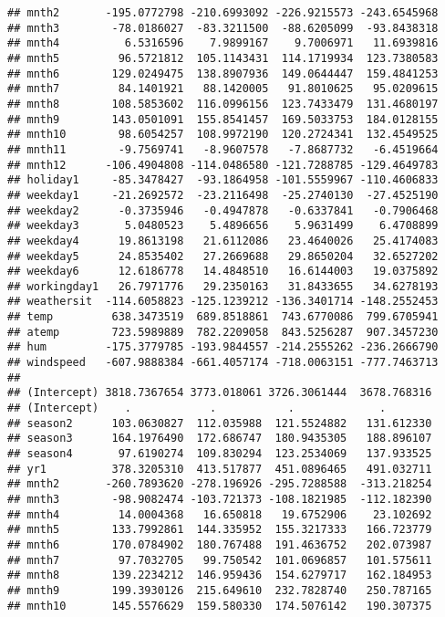 \documentclass[]{article}
\begin{document}
\begin{verbatim}
## mnth2       -195.0772798 -210.6993092 -226.9215573 -243.6545968
## mnth3        -78.0186027  -83.3211500  -88.6205099  -93.8438318
## mnth4          6.5316596    7.9899167    9.7006971   11.6939816
## mnth5         96.5721812  105.1143431  114.1719934  123.7380583
## mnth6        129.0249475  138.8907936  149.0644447  159.4841253
## mnth7         84.1401921   88.1420005   91.8010625   95.0209615
## mnth8        108.5853602  116.0996156  123.7433479  131.4680197
## mnth9        143.0501091  155.8541457  169.5033753  184.0128155
## mnth10        98.6054257  108.9972190  120.2724341  132.4549525
## mnth11        -9.7569741   -8.9607578   -7.8687732   -6.4519664
## mnth12      -106.4904808 -114.0486580 -121.7288785 -129.4649783
## holiday1     -85.3478427  -93.1864958 -101.5559967 -110.4606833
## weekday1     -21.2692572  -23.2116498  -25.2740130  -27.4525190
## weekday2      -0.3735946   -0.4947878   -0.6337841   -0.7906468
## weekday3       5.0480523    5.4896656    5.9631499    6.4708899
## weekday4      19.8613198   21.6112086   23.4640026   25.4174083
## weekday5      24.8535402   27.2669688   29.8650204   32.6527202
## weekday6      12.6186778   14.4848510   16.6144003   19.0375892
## workingday1   26.7971776   29.2350163   31.8433655   34.6278193
## weathersit  -114.6058823 -125.1239212 -136.3401714 -148.2552453
## temp         638.3473519  689.8518861  743.6770086  799.6705941
## atemp        723.5989889  782.2209058  843.5256287  907.3457230
## hum         -175.3779785 -193.9844557 -214.2555262 -236.2666790
## windspeed   -607.9888384 -661.4057174 -718.0063151 -777.7463713
##                                                               
## (Intercept) 3818.7367654 3773.018061 3726.3061444  3678.768316
## (Intercept)    .            .           .             .       
## season2      103.0630827  112.035988  121.5524882   131.612330
## season3      164.1976490  172.686747  180.9435305   188.896107
## season4       97.6190274  109.830294  123.2534069   137.933525
## yr1          378.3205310  413.517877  451.0896465   491.032711
## mnth2       -260.7893620 -278.196926 -295.7288588  -313.218254
## mnth3        -98.9082474 -103.721373 -108.1821985  -112.182390
## mnth4         14.0004368   16.650818   19.6752906    23.102692
## mnth5        133.7992861  144.335952  155.3217333   166.723779
## mnth6        170.0784902  180.767488  191.4636752   202.073987
## mnth7         97.7032705   99.750542  101.0696857   101.575611
## mnth8        139.2234212  146.959436  154.6279717   162.184953
## mnth9        199.3930126  215.649610  232.7828740   250.787165
## mnth10       145.5576629  159.580330  174.5076142   190.307375

\end{verbatim}
\end{document}
